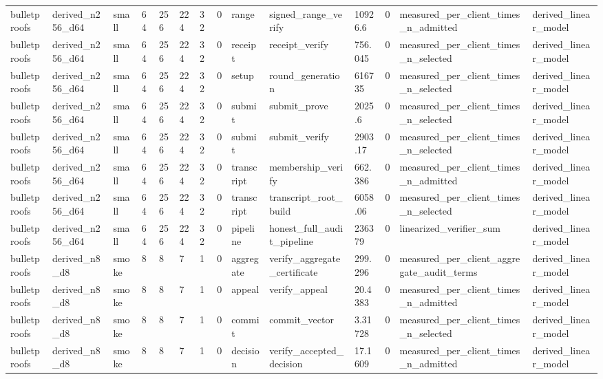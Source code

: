 \begin{table}[t]
\begin{tabular}{llllllllllllll}
bulletproofs & derived\_n256\_d64 & small & 64 & 256 & 224 & 32 & 0 & range & signed\_range\_verify & 10926.6 & 0 & measured\_per\_client\_times\_n\_admitted & derived\_linear\_model \\
bulletproofs & derived\_n256\_d64 & small & 64 & 256 & 224 & 32 & 0 & receipt & receipt\_verify & 756.045 & 0 & measured\_per\_client\_times\_n\_selected & derived\_linear\_model \\
bulletproofs & derived\_n256\_d64 & small & 64 & 256 & 224 & 32 & 0 & setup & round\_generation & 616735 & 0 & measured\_per\_client\_times\_n\_selected & derived\_linear\_model \\
bulletproofs & derived\_n256\_d64 & small & 64 & 256 & 224 & 32 & 0 & submit & submit\_prove & 2025.6 & 0 & measured\_per\_client\_times\_n\_selected & derived\_linear\_model \\
bulletproofs & derived\_n256\_d64 & small & 64 & 256 & 224 & 32 & 0 & submit & submit\_verify & 2903.17 & 0 & measured\_per\_client\_times\_n\_selected & derived\_linear\_model \\
bulletproofs & derived\_n256\_d64 & small & 64 & 256 & 224 & 32 & 0 & transcript & membership\_verify & 662.386 & 0 & measured\_per\_client\_times\_n\_admitted & derived\_linear\_model \\
bulletproofs & derived\_n256\_d64 & small & 64 & 256 & 224 & 32 & 0 & transcript & transcript\_root\_build & 6058.06 & 0 & measured\_per\_client\_times\_n\_selected & derived\_linear\_model \\
bulletproofs & derived\_n256\_d64 & small & 64 & 256 & 224 & 32 & 0 & pipeline & honest\_full\_audit\_pipeline & 236379 & 0 & linearized\_verifier\_sum & derived\_linear\_model \\
bulletproofs & derived\_n8\_d8 & smoke & 8 & 8 & 7 & 1 & 0 & aggregate & verify\_aggregate\_certificate & 299.296 & 0 & measured\_per\_client\_aggregate\_audit\_terms & derived\_linear\_model \\
bulletproofs & derived\_n8\_d8 & smoke & 8 & 8 & 7 & 1 & 0 & appeal & verify\_appeal & 20.4383 & 0 & measured\_per\_client\_times\_n\_admitted & derived\_linear\_model \\
bulletproofs & derived\_n8\_d8 & smoke & 8 & 8 & 7 & 1 & 0 & commit & commit\_vector & 3.31728 & 0 & measured\_per\_client\_times\_n\_selected & derived\_linear\_model \\
bulletproofs & derived\_n8\_d8 & smoke & 8 & 8 & 7 & 1 & 0 & decision & verify\_accepted\_decision & 17.1609 & 0 & measured\_per\_client\_times\_n\_admitted & derived\_linear\_model \\

\end{tabular}
\end{table}
